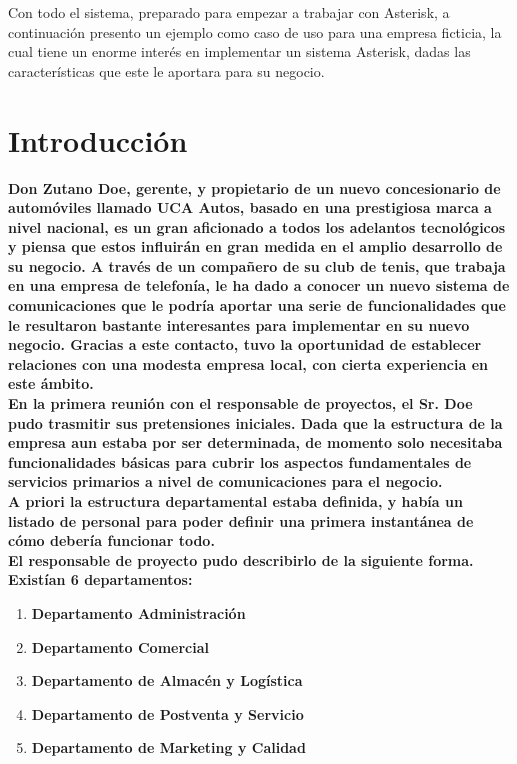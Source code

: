 
Con todo el sistema, preparado para empezar a trabajar con Asterisk, a continuación presento un ejemplo como caso de uso para una empresa ficticia, la cual tiene un enorme interés en implementar un sistema Asterisk, dadas las características que este le aportara para su negocio.

\section{Introducción}

\textbf{Don Zutano Doe, gerente, y propietario de un nuevo concesionario de automóviles llamado UCA Autos, basado en una prestigiosa marca a nivel nacional, es un gran aficionado a todos los adelantos tecnológicos y piensa que estos influirán en gran medida en el amplio desarrollo de su negocio. A través de un compañero de su club de tenis, que trabaja en una empresa de telefonía, le ha dado a conocer un nuevo sistema de comunicaciones que le podría aportar una serie de funcionalidades que le resultaron bastante interesantes para implementar en su nuevo negocio. Gracias a este contacto, tuvo la oportunidad de establecer relaciones con una modesta empresa local, con cierta experiencia en este ámbito.}\\

\textbf{En la primera reunión con el responsable de proyectos, el Sr. Doe pudo trasmitir sus pretensiones iniciales. Dada que la estructura de la empresa aun estaba por ser determinada, de momento solo necesitaba funcionalidades básicas para cubrir los aspectos fundamentales de servicios primarios a nivel de comunicaciones para el negocio.}\\

\textbf{A priori la estructura departamental estaba definida, y había un listado de personal para poder definir una primera instantánea de cómo debería funcionar todo.}\\

\textbf{El responsable de proyecto pudo describirlo de la siguiente forma.}\\

\textbf{Existían 6 departamentos:}

\begin{enumerate}

\item \textbf{Departamento Administración}
\item \textbf{Departamento Comercial}
\item \textbf{Departamento de Almacén y Logística}
\item \textbf{Departamento de Postventa y Servicio}
\item \textbf{Departamento de Marketing y Calidad}

\end{enumerate}

